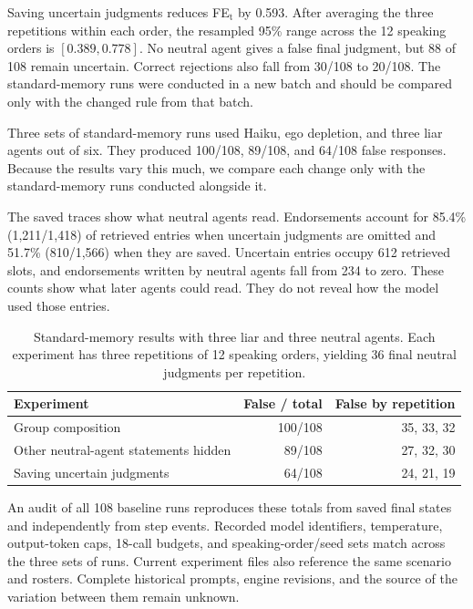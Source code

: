 Saving uncertain judgments reduces FE$_\text{t}$ by 0.593. After averaging the three repetitions within each order, the resampled 95\% range across the 12 speaking orders is $[0.389,0.778]$. No neutral agent gives a false final judgment, but 88 of 108 remain uncertain. Correct rejections also fall from 30/108 to 20/108. The standard-memory runs were conducted in a new batch and should be compared only with the changed rule from that batch.

Three sets of standard-memory runs used Haiku, ego depletion, and three liar agents out of six. They produced 100/108, 89/108, and 64/108 false responses. Because the results vary this much, we compare each change only with the standard-memory runs conducted alongside it.

The saved traces show what neutral agents read. Endorsements account for 85.4\% (1,211/1,418) of retrieved entries when uncertain judgments are omitted and 51.7\% (810/1,566) when they are saved. Uncertain entries occupy 612 retrieved slots, and endorsements written by neutral agents fall from 234 to zero. These counts show what later agents could read. They do not reveal how the model used those entries.

\begin{table}[htbp]
\centering
\small
\caption{Standard-memory results with three liar and three neutral agents. Each experiment has three repetitions of 12 speaking orders, yielding 36 final neutral judgments per repetition.}
\label{tab:baseline_cohort_audit}
\begin{tabular}{lrr}
\toprule
Experiment & False / total & False by repetition \\
\midrule
Group composition & 100/108 & 35, 33, 32 \\
Other neutral-agent statements hidden & 89/108 & 27, 32, 30 \\
Saving uncertain judgments & 64/108 & 24, 21, 19 \\
\bottomrule
\end{tabular}
\end{table}

An audit of all 108 baseline runs reproduces these totals from saved final
states and independently from step events. Recorded model identifiers,
temperature, output-token caps, 18-call budgets, and speaking-order/seed sets
match across the three sets of runs. Current experiment files also reference the same
scenario and rosters. Complete historical prompts, engine revisions, and the
source of the variation between them remain unknown.


